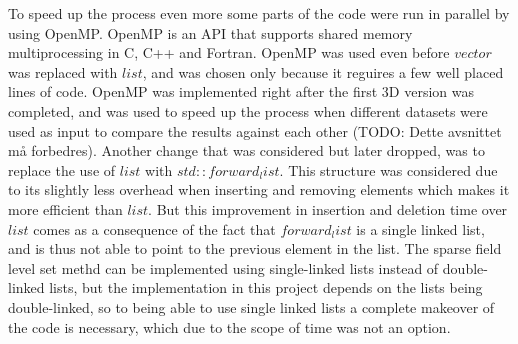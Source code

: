 To speed up the process even more some parts of the code were run in parallel by using OpenMP. OpenMP is an API that supports shared memory multiprocessing in C, C++ and Fortran. OpenMP was used even before $vector$ was replaced with $list$, and was chosen only because it reguires a few well placed lines of code. OpenMP was implemented right after the first 3D version was completed, and was used to speed up the process when different datasets were used as input to compare the results against each other (TODO: Dette avsnittet må forbedres).
Another change that was considered but later dropped, was to replace the use of $list$ with $std::forward_list$. This structure was considered due to its slightly less overhead when inserting and removing elements which makes it more efficient than $list$. But this improvement in insertion and deletion time over $list$ comes as a consequence of the fact that $forward_list$ is a single linked list, and is thus not able to point to the previous element in the list. The sparse field level set methd can be implemented using single-linked lists instead of double-linked lists, but the implementation in this project depends on the lists being double-linked, so to being able to use single linked lists a complete makeover of the code is necessary, which due to the scope of time was not an option.


